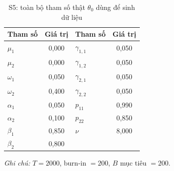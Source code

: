 \documentclass[11pt,a4paper]{article}
\begin{document}
\begin{table}[H]\centering\small
\caption{S5: toàn bộ tham số thật $\theta_0$ dùng để sinh dữ liệu}
\begin{tabularx}{\textwidth}{l C  l C}
\toprule
\textbf{Tham số} & \textbf{Giá trị} & \textbf{Tham số} & \textbf{Giá trị} \\
\midrule
$\mu_1$ & 0{,}000 & $\gamma_{1,1}$ & 0{,}050 \\
$\mu_2$ & 0{,}000 & $\gamma_{1,2}$ & 0{,}050 \\
$\omega_1$ & 0{,}050 & $\gamma_{2,1}$ & 0{,}050 \\
$\omega_2$ & 0{,}400 & $\gamma_{2,2}$ & 0{,}050 \\
$\alpha_1$ & 0{,}050 & $p_{11}$ & 0{,}990 \\
$\alpha_2$ & 0{,}100 & $p_{22}$ & 0{,}850 \\
$\beta_1$ & 0{,}850 & $\nu$ & 8{,}000 \\
$\beta_2$ & 0{,}800 & & \\
\bottomrule
\end{tabularx}
\vspace{0.2em}\raggedright\scriptsize \emph{Ghi chú:} $T=2000$, burn-in $=200$, $B$ mục tiêu $=200$.
\end{table}
\end{document}
